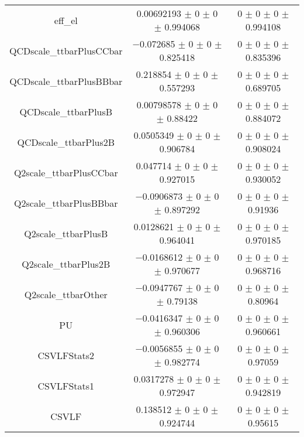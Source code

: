 \begin{table}
\begin{tabular}{ccc}
eff\_el 	& \num{0.00692193} $\pm$ \num{0} $\pm$ \num{0} $\pm$ \num{0.994068} 	& \num{0} $\pm$ \num{0} $\pm$ \num{0} $\pm$ \num{0.994108}\\
QCDscale\_ttbarPlusCCbar 	& \num{-0.072685} $\pm$ \num{0} $\pm$ \num{0} $\pm$ \num{0.825418} 	& \num{0} $\pm$ \num{0} $\pm$ \num{0} $\pm$ \num{0.835396}\\
QCDscale\_ttbarPlusBBbar 	& \num{0.218854} $\pm$ \num{0} $\pm$ \num{0} $\pm$ \num{0.557293} 	& \num{0} $\pm$ \num{0} $\pm$ \num{0} $\pm$ \num{0.689705}\\
QCDscale\_ttbarPlusB 	& \num{0.00798578} $\pm$ \num{0} $\pm$ \num{0} $\pm$ \num{0.88422} 	& \num{0} $\pm$ \num{0} $\pm$ \num{0} $\pm$ \num{0.884072}\\
QCDscale\_ttbarPlus2B 	& \num{0.0505349} $\pm$ \num{0} $\pm$ \num{0} $\pm$ \num{0.906784} 	& \num{0} $\pm$ \num{0} $\pm$ \num{0} $\pm$ \num{0.908024}\\
Q2scale\_ttbarPlusCCbar 	& \num{0.047714} $\pm$ \num{0} $\pm$ \num{0} $\pm$ \num{0.927015} 	& \num{0} $\pm$ \num{0} $\pm$ \num{0} $\pm$ \num{0.930052}\\
Q2scale\_ttbarPlusBBbar 	& \num{-0.0906873} $\pm$ \num{0} $\pm$ \num{0} $\pm$ \num{0.897292} 	& \num{0} $\pm$ \num{0} $\pm$ \num{0} $\pm$ \num{0.91936}\\
Q2scale\_ttbarPlusB 	& \num{0.0128621} $\pm$ \num{0} $\pm$ \num{0} $\pm$ \num{0.964041} 	& \num{0} $\pm$ \num{0} $\pm$ \num{0} $\pm$ \num{0.970185}\\
Q2scale\_ttbarPlus2B 	& \num{-0.0168612} $\pm$ \num{0} $\pm$ \num{0} $\pm$ \num{0.970677} 	& \num{0} $\pm$ \num{0} $\pm$ \num{0} $\pm$ \num{0.968716}\\
Q2scale\_ttbarOther 	& \num{-0.0947767} $\pm$ \num{0} $\pm$ \num{0} $\pm$ \num{0.79138} 	& \num{0} $\pm$ \num{0} $\pm$ \num{0} $\pm$ \num{0.80964}\\
PU 	& \num{-0.0416347} $\pm$ \num{0} $\pm$ \num{0} $\pm$ \num{0.960306} 	& \num{0} $\pm$ \num{0} $\pm$ \num{0} $\pm$ \num{0.960661}\\
CSVLFStats2 	& \num{-0.0056855} $\pm$ \num{0} $\pm$ \num{0} $\pm$ \num{0.982774} 	& \num{0} $\pm$ \num{0} $\pm$ \num{0} $\pm$ \num{0.97059}\\
CSVLFStats1 	& \num{0.0317278} $\pm$ \num{0} $\pm$ \num{0} $\pm$ \num{0.972947} 	& \num{0} $\pm$ \num{0} $\pm$ \num{0} $\pm$ \num{0.942819}\\
CSVLF 	& \num{0.138512} $\pm$ \num{0} $\pm$ \num{0} $\pm$ \num{0.924744} 	& \num{0} $\pm$ \num{0} $\pm$ \num{0} $\pm$ \num{0.95615}\\

\end{tabular}
\end{table}
